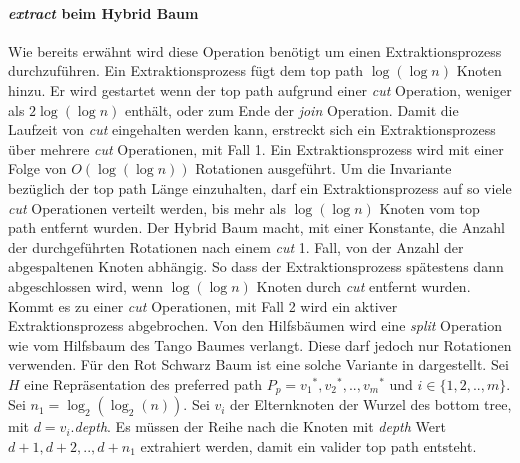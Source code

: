 \documentclass[a4paper,12pt]{article}
\begin{document}
\paragraph{\textit{extract} beim Hybrid Baum} \label{hybridExtract}
Wie bereits erwähnt wird diese Operation benötigt um einen Extraktionsprozess durchzuführen. Ein Extraktionsprozess fügt dem top path $\log\left(\log n\right)$ Knoten hinzu. Er wird gestartet wenn der top path aufgrund einer \textit{cut} Operation, weniger als $2\log\left(\log n\right)$ enthält, oder zum Ende der \textit{join} Operation. Damit die Laufzeit von \textit{cut} eingehalten werden kann, erstreckt sich ein Extraktionsprozess über mehrere \textit{cut} Operationen, mit Fall 1. Ein Extraktionsprozess wird mit einer Folge von $O\left(\log\left(\log n\right)\right)$ Rotationen ausgeführt. Um die Invariante bezüglich der top path Länge einzuhalten, darf ein Extraktionsprozess auf so viele \textit{cut} Operationen verteilt werden, bis mehr als $\log\left(\log n\right)$ Knoten vom top path entfernt wurden. Der Hybrid Baum macht, mit einer Konstante,  die Anzahl der durchgeführten Rotationen nach einem \textit{cut} 1. Fall, von der Anzahl der abgespaltenen Knoten abhängig. So dass der  Extraktionsprozess spätestens dann abgeschlossen wird, wenn $\log\left(\log n\right)$ Knoten durch \textit{cut} entfernt wurden. Kommt es zu einer \textit{cut} Operationen, mit Fall 2 wird ein aktiver Extraktionsprozess abgebrochen. 
Von den Hilfsbäumen wird eine \textit{split} Operation wie vom Hilfsbaum des Tango Baumes verlangt. Diese darf jedoch nur Rotationen verwenden. Für den Rot Schwarz Baum ist eine solche Variante in \cite{zipper} dargestellt. 
Sei $H$ eine Repräsentation des preferred path $P_p = {v_1}^*,{v_2}^*,..,{v_m}^*$ und $i \in \{1, 2,..,m\}$. Sei $n_1 = \log_2\left(\log_2\left(n\right)\right)$. Sei $v_i$ der Elternknoten der Wurzel des bottom tree, mit $d = v_i.$\textit{depth}. Es müssen der Reihe nach die Knoten mit \textit{depth} Wert $d+1, d+2,..,d + n_1$ extrahiert werden, damit ein valider top path entsteht. 
\end{document}
